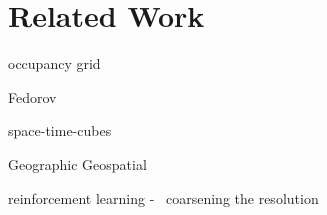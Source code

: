 \section{Related Work}
\label{sec:related}


occupancy grid

Fedorov~\cite{fedorov1885elements}

space-time-cubes


Geographic Geospatial


reinforcement learning - ~coarsening the resolution 






